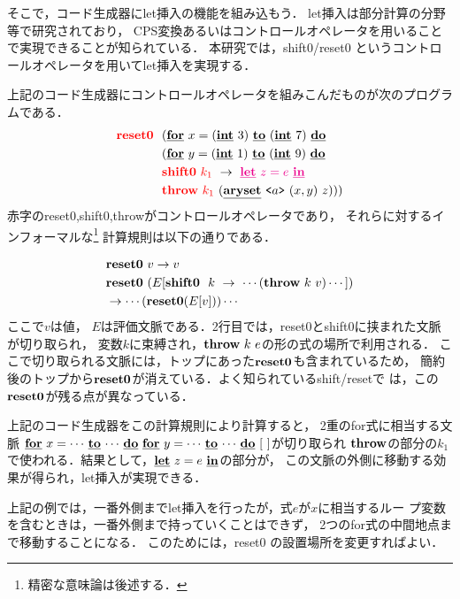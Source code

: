 そこで，コード生成器にlet挿入の機能を組み込もう．
let挿入は部分計算の分野等で研究されており，
CPS変換あるいはコントロールオペレータを用いることで実現できることが知られている．
本研究では，shift0/reset0 というコントロールオペレータを用いてlet挿入を実現する．

上記のコード生成器にコントロールオペレータを組みこんだものが次のプログラムである．
\begin{align*}
  &\red{\Resetz} ~~(\cforin{x=(\cint~3)}{(\cint~7)} \\
  &\phantom{\Resetz} ~~(\cforin{y=(\cint~1)}{(\cint~9)} \\
  &\phantom{\Resetz} ~~\red{\Shiftz}~\red{k_1}~\to~ \magenta{\cLet~z=e~\cIn} \\
  &\phantom{\Resetz} ~~\red{\Throw}~\red{k_1}~(\caryset{\code{a}}{(x,y)}{z})))
\end{align*}
赤字のreset0,shift0,throwがコントロールオペレータであり，
それらに対するインフォーマルな\footnote{精密な意味論は後述する．}%
計算規則は以下の通りである．

\begin{align*}
  & \textbf{reset0} ~v \to v \\
  & \textbf{reset0} ~(E[\textbf{shift0}~~k~\to~\cdots(\textbf{throw}~k~v)\cdots]) \\
  & \to \cdots(\textbf{reset0}(E[v]))\cdots
\end{align*}
ここで$v$は値，
$E$は評価文脈である．2行目では，reset0とshift0に挟まれた文脈が切り取られ，
変数$k$に束縛され，$\textbf{throw}~k~e$の形の式の場所で利用される．
ここで切り取られる文脈には，トップにあった$\textbf{reset0}$も含まれているため，
簡約後のトップから$\textbf{reset0}$が消えている．よく知られているshift/resetで
は，この$\textbf{reset0}$が残る点が異なっている．

上記のコード生成器をこの計算規則により計算すると，
2重のfor式に相当する文脈
$\underline{\textbf{for}}~{x=\cdots}~\underline{\textbf{to}}~{\cdots}~\underline{\textbf{do}}~\underline{\textbf{for}}~{y=\cdots}~\underline{\textbf{to}}~{\cdots}~\underline{\textbf{do}}~[~]$が切り取られ
$\textbf{throw}$の部分の$k_1$で使われる．結果として，$\underline{\textbf{let}}~z=e~\underline{\textbf{in}}$の部分が，
この文脈の外側に移動する効果が得られ，let挿入が実現できる．

上記の例では，一番外側までlet挿入を行ったが，式$e$が$x$に相当するルー
プ変数を含むときは，一番外側まで持っていくことはできず，
2つのfor式の中間地点まで移動することになる．
このためには，reset0 の設置場所を変更すればよい．

